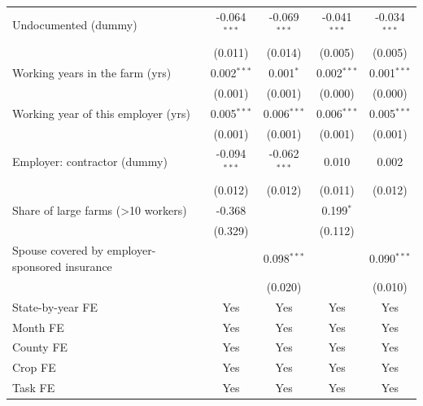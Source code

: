\documentclass[12pt]{article}
\newcommand{\sym}[1]{\ensuremath{^{#1}}}
\begin{document}
\begin{appendices}
\begin{table}[h!]
\begin{tabular}{l*{4}{c}}
Undocumented (dummy)&      -0.064\sym{***}&      -0.069\sym{***}&      -0.041\sym{***}&      -0.034\sym{***}\\
                    &     (0.011)         &     (0.014)         &     (0.005)         &     (0.005)         \\
Working years in the farm (yrs)&       0.002\sym{***}&       0.001\sym{*}  &       0.002\sym{***}&       0.001\sym{***}\\
                    &     (0.001)         &     (0.001)         &     (0.000)         &     (0.000)         \\
Working year of this employer (yrs)&       0.005\sym{***}&       0.006\sym{***}&       0.006\sym{***}&       0.005\sym{***}\\
                    &     (0.001)         &     (0.001)         &     (0.001)         &     (0.001)         \\
Employer: contractor (dummy)&      -0.094\sym{***}&      -0.062\sym{***}&       0.010         &       0.002         \\
                    &     (0.012)         &     (0.012)         &     (0.011)         &     (0.012)         \\
Share of large farms (>10 workers)&      -0.368         &                     &       0.199\sym{*}  &                     \\
                    &     (0.329)         &                     &     (0.112)         &                     \\
Spouse covered by employer-sponsored insurance&                     &       0.098\sym{***}&                     &       0.090\sym{***}\\
                    &                     &     (0.020)         &                     &     (0.010)         \\
\hline
State-by-year FE    &         Yes         &         Yes         &         Yes         &         Yes         \\
Month FE            &         Yes         &         Yes         &         Yes         &         Yes         \\
County FE           &         Yes         &         Yes         &         Yes         &         Yes         \\
Crop FE             &         Yes         &         Yes         &         Yes         &         Yes         \\
Task FE             &         Yes         &         Yes         &         Yes         &         Yes         \\

\end{tabular}
\end{table}
\end{appendices}
\end{document}
